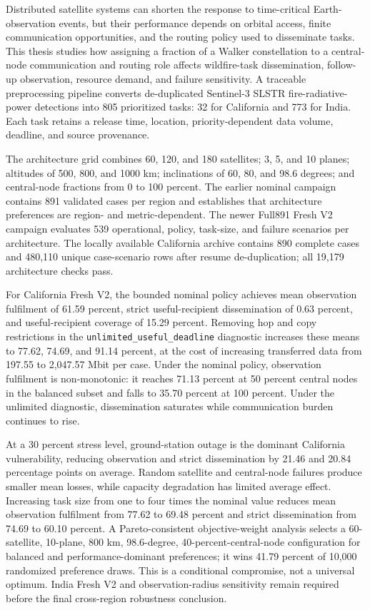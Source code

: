 Distributed satellite systems can shorten the response to time-critical Earth-observation events, but their performance depends on orbital access, finite communication opportunities, and the routing policy used to disseminate tasks. This thesis studies how assigning a fraction of a Walker constellation to a central-node communication and routing role affects wildfire-task dissemination, follow-up observation, resource demand, and failure sensitivity. A traceable preprocessing pipeline converts de-duplicated Sentinel-3 SLSTR fire-radiative-power detections into 805 prioritized tasks: 32 for California and 773 for India. Each task retains a release time, location, priority-dependent data volume, deadline, and source provenance.

The architecture grid combines 60, 120, and 180 satellites; 3, 5, and 10 planes; altitudes of 500, 800, and 1000 km; inclinations of 60, 80, and 98.6 degrees; and central-node fractions from 0 to 100 percent. The earlier nominal campaign contains 891 validated cases per region and establishes that architecture preferences are region- and metric-dependent. The newer Full891 Fresh V2 campaign evaluates 539 operational, policy, task-size, and failure scenarios per architecture. The locally available California archive contains 890 complete cases and 480,110 unique case-scenario rows after resume de-duplication; all 19,179 architecture checks pass.

For California Fresh V2, the bounded nominal policy achieves mean observation fulfilment of 61.59 percent, strict useful-recipient dissemination of 0.63 percent, and useful-recipient coverage of 15.29 percent. Removing hop and copy restrictions in the \texttt{unlimited\_useful\_deadline} diagnostic increases these means to 77.62, 74.69, and 91.14 percent, at the cost of increasing transferred data from 197.55 to 2,047.57 Mbit per case. Under the nominal policy, observation fulfilment is non-monotonic: it reaches 71.13 percent at 50 percent central nodes in the balanced subset and falls to 35.70 percent at 100 percent. Under the unlimited diagnostic, dissemination saturates while communication burden continues to rise.

At a 30 percent stress level, ground-station outage is the dominant California vulnerability, reducing observation and strict dissemination by 21.46 and 20.84 percentage points on average. Random satellite and central-node failures produce smaller mean losses, while capacity degradation has limited average effect. Increasing task size from one to four times the nominal value reduces mean observation fulfilment from 77.62 to 69.48 percent and strict dissemination from 74.69 to 60.10 percent. A Pareto-consistent objective-weight analysis selects a 60-satellite, 10-plane, 800 km, 98.6-degree, 40-percent-central-node configuration for balanced and performance-dominant preferences; it wins 41.79 percent of 10,000 randomized preference draws. This is a conditional compromise, not a universal optimum. India Fresh V2 and observation-radius sensitivity remain required before the final cross-region robustness conclusion.
